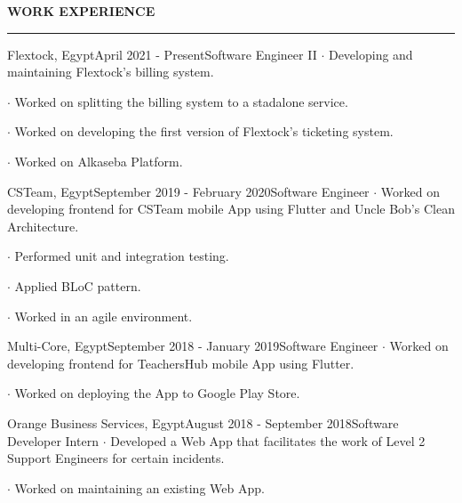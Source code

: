 \noindent\textcolor{themecolor}{\textbf{WORK EXPERIENCE}}

\vspace{2mm}
\hrule
\vspace{3mm}

\begin{verbose}{Flextock, Egypt}{April 2021 - Present}{Software Engineer II}
    \noindent $\cdot$ Developing and maintaining Flextock's billing system.

    \noindent $\cdot$ Worked on splitting the billing system to a stadalone service.

    \noindent $\cdot$ Worked on developing the first version of Flextock's ticketing system.

    \noindent $\cdot$ Worked on Alkaseba Platform.
\end{verbose}

\vspace{3mm}

\begin{verbose}{CSTeam, Egypt}{September 2019 - February 2020}{Software Engineer}
    \noindent $\cdot$ Worked on developing frontend for CSTeam mobile App using Flutter and Uncle Bob's Clean Architecture.

    \noindent $\cdot$ Performed unit and integration testing.
    
    \noindent $\cdot$ Applied BLoC pattern.
    
    \noindent $\cdot$ Worked in an agile environment.
\end{verbose}

\vspace{3mm}

\begin{verbose}{Multi-Core, Egypt}{September 2018 - January 2019}{Software Engineer}
    \noindent $\cdot$ Worked on developing frontend for TeachersHub mobile App using Flutter.

    \noindent $\cdot$ Worked on deploying the App to Google Play Store.
\end{verbose}

\vspace{3mm}

\begin{verbose}{Orange Business Services, Egypt}{August 2018 - September 2018}{Software Developer Intern}
    \noindent $\cdot$ Developed a Web App that facilitates the work of Level 2 Support Engineers for certain incidents.

    \noindent $\cdot$ Worked on maintaining an existing Web App.
\end{verbose}

